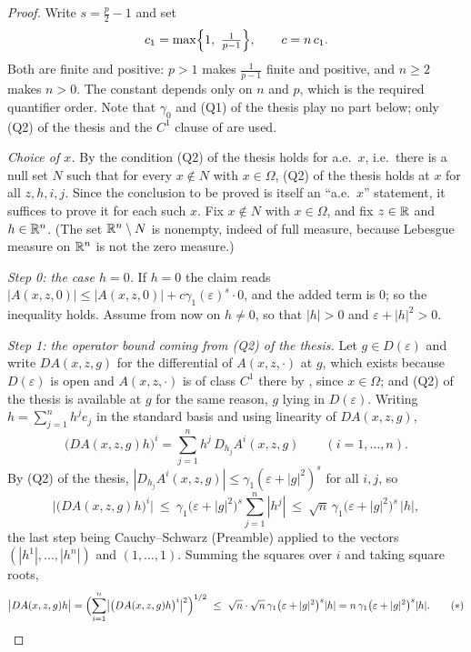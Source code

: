 \begin{proof}
Write $s=\frac p2-1$ and set
\[
c_1=\max\Bigl\{1,\ \tfrac1{p-1}\Bigr\},\qquad c=n\,c_1 .
\]
Both are finite and positive: $p>1$ makes $\frac1{p-1}$ finite and positive,
and $n\ge2$ makes $n>0$.  The constant depends only on $n$ and $p$, which is
the required quantifier order.  Note that $\gamma_0$ and (Q1) of the thesis play no
part below; only (Q2) of the thesis and the $C^1$ clause of
 are used.

\emph{Choice of $x$.}  By  the condition
(Q2) of the thesis holds for a.e.\ $x$, i.e.\ there is a null set $N$ such that for
every $x\notin N$ with $x\in\Omega$, (Q2) of the thesis holds at $x$ for all
$z,h,i,j$.  Since the conclusion to be proved is itself an
``a.e.\ $x$'' statement, it suffices to prove it for each such $x$.  Fix
$x\notin N$ with $x\in\Omega$, and fix $z\in\mathbb{R}$ and $h\in\mathbb{R}^n$.  (The set
$\mathbb{R}^n\setminus N$ is nonempty, indeed of full measure, because Lebesgue measure
on $\mathbb{R}^n$ is not the zero measure.)

\emph{Step 0: the case $h=0$.}  If $h=0$ the claim reads
$|A(x,z,0)|\le|A(x,z,0)|+c\gamma_1(\varepsilon)^{s}\cdot0$, and the added term
is $0$; so the inequality holds.  Assume from now on $h\ne0$, so that $|h|>0$
and $\varepsilon+|h|^2>0$.

\emph{Step 1: the operator bound coming from (Q2) of the thesis.}  Let
$g\in D(\varepsilon)$ and write $D A(x,z,g)$ for the differential of
$A(x,z,\cdot)$ at $g$, which exists because $D(\varepsilon)$ is open and
$A(x,z,\cdot)$ is of class $C^1$ there by , since
$x\in\Omega$; and (Q2) of the thesis is available at $g$ for the same reason, $g$
lying in $D(\varepsilon)$.  Writing
$h=\sum_{j=1}^nh^je_j$ in the standard basis and using linearity of
$DA(x,z,g)$,
\[
\bigl(DA(x,z,g)h\bigr)^i=\sum_{j=1}^nh^j\,D_{h_j}A^i(x,z,g)
\qquad(i=1,\dots,n).
\]
By (Q2) of the thesis, $|D_{h_j}A^i(x,z,g)|\le\gamma_1(\varepsilon+|g|^2)^{s}$ for
all $i,j$, so
\[
\bigl|\bigl(DA(x,z,g)h\bigr)^i\bigr|
\ \le\ \gamma_1\bigl(\varepsilon+|g|^2\bigr)^{s}\sum_{j=1}^n|h^j|
\ \le\ \sqrt n\,\gamma_1\bigl(\varepsilon+|g|^2\bigr)^{s}\,|h| ,
\]
the last step being Cauchy--Schwarz (Preamble) applied to the vectors
$(|h^1|,\dots,|h^n|)$ and $(1,\dots,1)$.  Summing the squares over $i$ and
taking square roots,
\[
\bigl|DA(x,z,g)h\bigr|
=\Bigl(\sum_{i=1}^n\bigl|\bigl(DA(x,z,g)h\bigr)^i\bigr|^2\Bigr)^{1/2}
\ \le\ \sqrt n\cdot\sqrt n\,\gamma_1\bigl(\varepsilon+|g|^2\bigr)^{s}|h|
= n\,\gamma_1\bigl(\varepsilon+|g|^2\bigr)^{s}|h| .
\tag{$*$}
\]


\end{proof}
